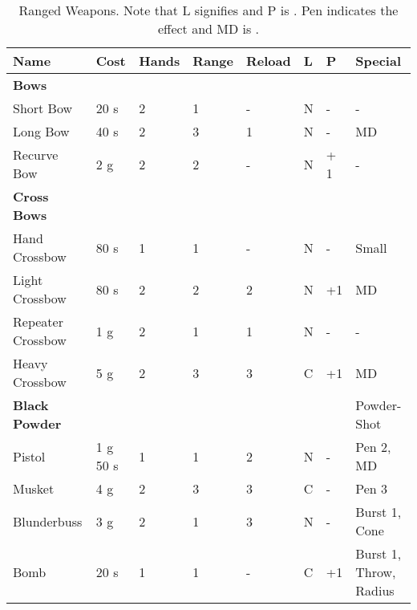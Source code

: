\begin{table}[ht!]
	\centering
	\caption{Ranged Weapons. Note that L signifies  and P is . Pen indicates the  effect and MD is .}
	\begin{tabular}{|l|l|l|l|l|l|l|l|}
		\hline
		Name & Cost & Hands & Range & Reload & L & P & Special\\ [0.5ex]
		\hline
		\textbf{Bows} & & & & & & & \\
		\hline
		Short Bow & 20 s & 2 & 1 & - & N & - & -\\
		Long Bow & 40 s & 2 & 3 & 1 & N & - & MD \\
		Recurve Bow & 2 g & 2 & 2 & - & N & + 1 & -\\
		\hline
		\textbf{Cross Bows} & & & &  & &  & \\
		\hline
		Hand Crossbow & 80 s & 1 & 1 & - & N & - & Small \\ 
		Light Crossbow &  80 s & 2 & 2 & 2 & N & +1 & MD\\
		Repeater Crossbow & 1 g & 2 & 1 & 1 & N & - & - \\  
		Heavy Crossbow & 5 g & 2 & 3 & 3 & C & +1 & MD \\
		\hline
		\textbf{Black Powder} & & & & & & & Powder-Shot \\
		\hline
		Pistol & 1 g 50 s & 1 & 1 & 2 & N & - & Pen 2, MD \\
		Musket & 4 g & 2 & 3 & 3 & C & - & Pen 3 \\
		Blunderbuss & 3 g & 2 & 1 & 3 & N & - & Burst 1, Cone\\
		Bomb & 20 s & 1 & 1 & - & C & +1 & Burst 1, Throw, Radius \\
		\hline 
	\end{tabular}
	\label{tab:range-weps}    
\end{table}

